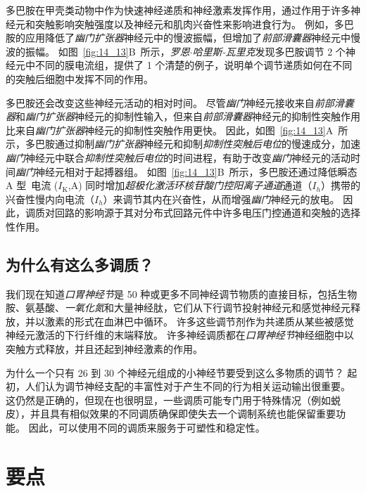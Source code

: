多巴胺在甲壳类动物中作为快速神经递质和神经激素发挥作用，通过作用于许多神经元和突触影响突触强度以及神经元和肌肉兴奋性来影响进食行为。
例如，多巴胺的应用降低了\textit{幽门扩张器}神经元中的慢波振幅，但增加了\textit{前部滑囊器}神经元中慢波的振幅。
如图~\ref{fig:14_13}B~所示，\textit{罗恩$\cdot$哈里斯-瓦里克}发现多巴胺调节 2 个神经元中不同的膜电流组，提供了 1 个清楚的例子，说明单个调节递质如何在不同的突触后细胞中发挥不同的作用。


多巴胺还会改变这些神经元活动的相对时间。
尽管\textit{幽门}神经元接收来自\textit{前部滑囊器}和\textit{幽门扩张器}神经元的抑制性输入，但来自\textit{前部滑囊器}神经元的抑制性突触作用比来自\textit{幽门扩张器}神经元的抑制性突触作用更快。
因此，如图~\ref{fig:14_13}A~所示，多巴胺通过抑制\textit{幽门扩张器}神经元和抑制\textit{抑制性突触后电位}的慢速成分，加速\textit{幽门}神经元中联合\textit{抑制性突触后电位}的时间进程，有助于改变\textit{幽门}神经元的活动时间\textit{幽门}神经元相对于起搏器组。
如图~\ref{fig:14_13}B~所示，多巴胺还通过降低瞬态 A 型~电流 ($I_\text{K}$,A) 同时增加\textit{超极化激活环核苷酸门控阳离子通道}通道（$I_h$）携带的兴奋性慢内向电流（$I_h$）来调节其内在兴奋性，从而增强\textit{幽门}神经元的放电。
因此，调质对回路的影响源于其对分布式回路元件中许多电压门控通道和突触的选择性作用。



\subsection{为什么有这么多调质？}

我们现在知道\textit{口胃神经节}是 50 种或更多不同神经调节物质的直接目标，包括生物胺、氨基酸、\textit{一氧化氮}和大量神经肽，它们从下行调节投射神经元和感觉神经元释放，并以激素的形式在血淋巴中循环。
许多这些调节剂作为共递质从某些被感觉神经元激活的下行纤维的末端释放。
许多神经调质都在\textit{口胃神经节}神经细胞中以突触方式释放，并且还起到神经激素的作用。


为什么一个只有 26 到 30 个神经元组成的小神经节要受到这么多物质的调节？
起初，人们认为调节神经支配的丰富性对于产生不同的行为相关运动输出很重要。
这仍然是正确的，但现在也很明显，一些调质可能专门用于特殊情况（例如蜕皮），并且具有相似效果的不同调质确保即使失去一个调制系统也能保留重要功能。
因此，可以使用不同的调质来服务于可塑性和稳定性。



\section{要点}

